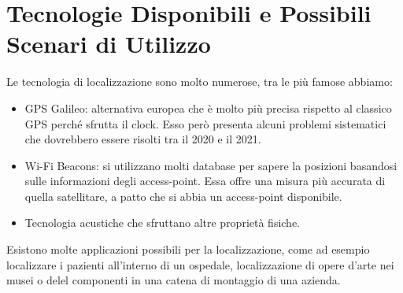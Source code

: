         \section{Tecnologie Disponibili e Possibili Scenari di
Utilizzo}\label{subsec3.2}
        Le tecnologia di localizzazione sono molto numerose, tra le più famose
abbiamo:
        \begin{itemize}
                \item GPS Galileo: alternativa europea che è molto più precisa
rispetto al classico GPS perché sfrutta il clock. Esso però presenta alcuni
problemi sistematici che dovrebbero essere risolti tra il 2020 e il 2021.
                \item Wi-Fi Beacons: si utilizzano molti database per sapere la
posizioni basandosi sulle informazioni degli access-point. Essa offre una misura
più accurata di quella satellitare, a patto che si abbia un access-point
disponibile.
                \item Tecnologia acustiche che sfruttano altre proprietà
fisiche.
        \end{itemize}

        Esistono molte applicazioni possibili per la localizzazione, come ad
esempio localizzare i pazienti all'interno di un ospedale, localizzazione di
opere d'arte nei musei o delel componenti in una catena di montaggio di una
azienda.


